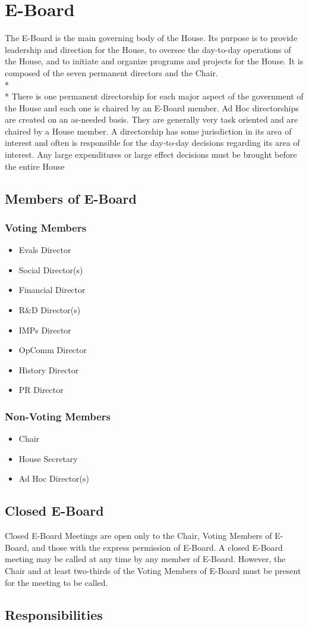 \documentclass{article}
\newcommand{\article}[1]{\section{#1} \label{#1}}
\newcommand{\asection}[1]{\subsection{#1} \label{#1}}
\newcommand{\asubsection}[1]{\subsubsection{#1} \label{#1}}
\begin{document}
\article{E-Board}
The E-Board is the main governing body of the House.
Its purpose is to provide leadership and direction for the House, to oversee the day-to-day operations of the House, and to initiate and organize programs and projects for the House.
It is composed of the seven permanent directors and the Chair.
\\*\\*
There is one permanent directorship for each major aspect of the government of the House and each one is chaired by an E-Board member.
Ad Hoc directorships are created on an as-needed basis.
They are generally very task oriented and are chaired by a House member.
A directorship has some jurisdiction in its area of interest and often is responsible for the day-to-day decisions regarding its area of interest.
Any large expenditures or large effect decisions must be brought before the entire House

\asection{Members of E-Board}

\asubsection{Voting Members}
\begin{itemize}
	\item Evals Director
	\item Social Director(s)
	\item Financial Director
	\item R\&D Director(s)
	\item IMPs Director
	\item OpComm Director
	\item History Director
	\item PR Director
\end{itemize}

\asubsection{Non-Voting Members}
\begin{itemize}
	\item Chair
	\item House Secretary
	\item Ad Hoc Director(s)
\end{itemize}

\asection{Closed E-Board}
Closed E-Board Meetings are open only to the Chair, Voting Members of E-Board, and those with the express permission of E-Board.
A closed E-Board meeting may be called at any time by any member of E-Board.
However, the Chair and at least two-thirds of the Voting Members of E-Board must be present for the meeting to be called.

\asection{Responsibilities}

\renewcommand{\theenumi}{\alph{enumi}} %
\end{document}
